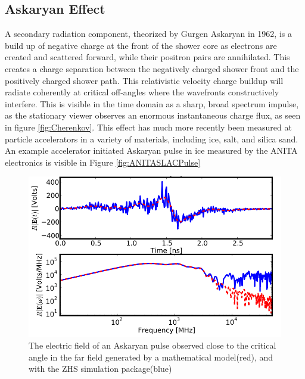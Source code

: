 	\subsection{Askaryan Effect}
		A secondary radiation component, theorized by Gurgen Askaryan in 1962, is a build up of negative charge at the front of the shower core as electrons are created and scattered forward, while their positron pairs are annihilated.\cite{Askaryan:1962hbi}  This creates a charge separation between the negatively charged shower front and the positively charged shower path.  This relativistic velocity charge buildup will radiate coherently at critical off-angles where the wavefronts constructively interfere.  This is visible in the time domain as a sharp, broad spectrum impulse,  as the stationary viewer observes an enormous instantaneous charge flux, as seen in figure \ref{fig:Cherenkov}.\cite{PhysRevD.84.103003}  This effect has much more recently been measured at particle accelerators in a variety of materials, including ice,\cite{PhysRevLett.99.171101} salt\cite{PhysRevD.72.023002}, and silica sand\cite{PhysRevLett.86.2802}.  An example accelerator initiated Askaryan pulse in ice measured by the ANITA electronics is visible in Figure \ref{fig:ANITASLACPulse}
		
		
\begin{figure}
\centering
	\includegraphics[width=\textwidth]{figures/AskaryanSimulation}
	\caption{The electric field of an Askaryan pulse observed close to the critical angle in the far field generated by a mathematical model(red), and with the ZHS simulation package(blue) \cite{PhysRevD.84.103003} }
	\label{fig:AskaryanSimulation}
\end{figure}


